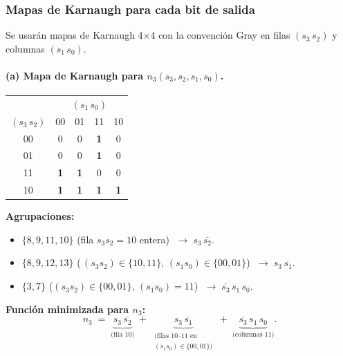 \documentclass[12pt]{article}
\begin{document}
\subsubsection{Mapas de Karnaugh para cada bit de salida}

Se usarán mapas de Karnaugh 4×4 con la convención Gray en filas \((s_3\,s_2)\) y columnas \((s_1\,s_0)\).  

\paragraph*{(a) Mapa de Karnaugh para \(n_{3}(s_{3},s_{2},s_{1},s_{0})\).}

\begin{center}
\begin{tabular}{c|cccc}
  \multicolumn{1}{c}{} & \multicolumn{4}{c}{\((s_{1}\,s_{0})\)} \\[-2pt]
  \cline{2-5}
  \((s_{3}\,s_{2})\) & 00 & 01 & 11 & 10 \\
  \cline{1-5}
  00 & 0 & 0 & \bf1 & 0 \\  %
  01 & 0 & 0 & \bf1 & 0 \\  %
  11 & \bf1 & \bf1 & 0 & 0 \\%
  10 & \bf1 & \bf1 & \bf1 & \bf1 \\ %
  \cline{1-5}
\end{tabular}
\end{center}

\noindent
\textbf{Agrupaciones:}
\begin{itemize}
  \item \(\{8,9,11,10\}\) (fila \(s_{3}s_{2}=10\) entera) \(\;\longrightarrow\; s_{3}\,\overline{s_{2}}\).
  \item \(\{8,9,12,13\}\) (\(\,(s_{3}s_{2})\in\{10,11\},\,(s_{1}s_{0})\in\{00,01\}\))  
    \(\;\longrightarrow\; s_{3}\,\overline{s_{1}}\).
  \item \(\{3,7\}\) (\((s_{3}s_{2})\in\{00,01\},\,(s_{1}s_{0})=11\))  
    \(\;\longrightarrow\; \overline{s_{3}}\,s_{1}\,s_{0}\).
\end{itemize}

\noindent
\textbf{Función minimizada para \(n_{3}\):}
\[
  n_{3} \;=\; 
    \underbrace{s_{3}\,\overline{s_{2}}}_{\text{(fila 10)}} 
    \;+\; 
    \underbrace{s_{3}\,\overline{s_{1}}}_{\substack{\text{(filas 10–11 en}\\(s_{1}s_{0})\in\{00,01\})}} 
    \;+\; 
    \underbrace{\overline{s_{3}}\,s_{1}\,s_{0}}_{\text{(columnas 11)}}.
\]
\end{document}
